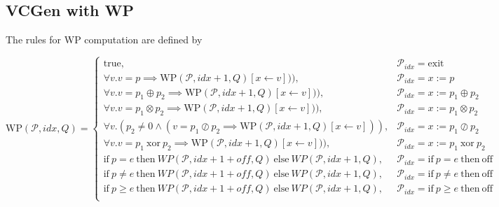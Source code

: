 \subsection{VCGen with WP}
\label{subsec:vcgen_wp}

The rules for WP computation are defined by


\[
  \mathrm{WP}(\mathcal{P}, idx, Q) =
  \begin{cases}
    \mathrm{true}, & \mathcal{P}_{idx} = \mathrm{exit} \\
    \forall v . v = p \implies \mathrm{WP}(\mathcal{P}, idx+1, Q)[x \leftarrow v])) , & \mathcal{P}_{idx} = x := p \\    
    \forall v . v = p_1 \oplus p_2 \implies \mathrm{WP}(\mathcal{P}, idx+1, Q)[x \leftarrow v])) , & \mathcal{P}_{idx} = x := p_1 \oplus p_2 \\
    \forall v . v = p_1 \otimes p_2 \implies \mathrm{WP}(\mathcal{P}, idx+1, Q)[x \leftarrow v])) , & \mathcal{P}_{idx} = x := p_1 \otimes p_2 \\    
    \forall v . (p_2  \neq 0 \land (v = p_1 \oslash p_2 \implies \mathrm{WP}(\mathcal{P}, idx+1, Q)[x \leftarrow v])) , & \mathcal{P}_{idx} = x := p_1 \oslash p_2 \\
    \forall v . v = p_1 ~ \mathrm{xor} ~ p_2 \implies \mathrm{WP}(\mathcal{P}, idx+1, Q)[x \leftarrow v])) , & \mathcal{P}_{idx} = x := p_1 ~ \mathrm{xor} ~ p_2 \\
    \mathrm{if} ~ p = e ~ \mathrm{then} ~ WP(\mathcal{P}, idx+1+off, Q) ~ \mathrm{else} ~ WP(\mathcal{P},idx+1, Q) , & \mathcal{P}_{idx} = \mathrm{if} ~ p = e ~ \mathrm{then} ~ \mathrm{off} \\
    \mathrm{if} ~ p \neq e ~ \mathrm{then} ~ WP(\mathcal{P}, idx+1+off, Q) ~ \mathrm{else} ~ WP(\mathcal{P},idx+1, Q) , & \mathcal{P}_{idx} = \mathrm{if} ~ p \neq e ~ \mathrm{then} ~ \mathrm{off} \\    
    \mathrm{if} ~ p \geq e ~ \mathrm{then} ~ WP(\mathcal{P}, idx+1+off, Q) ~ \mathrm{else} ~ WP(\mathcal{P},idx+1, Q) , & \mathcal{P}_{idx} = \mathrm{if} ~ p \geq e ~ \mathrm{then} ~ \mathrm{off} \\    \end{cases}
\]









